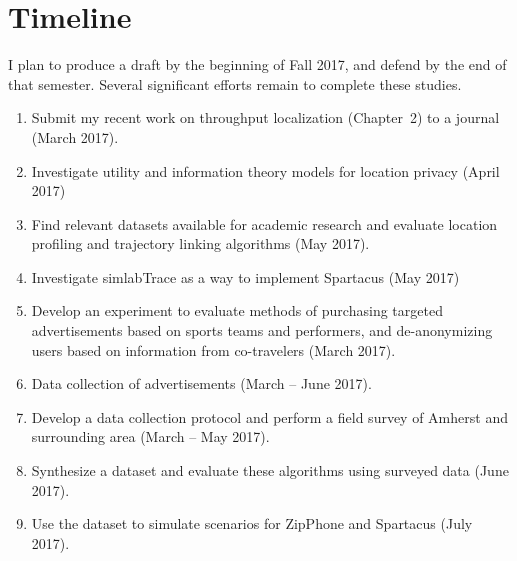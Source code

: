 \chapter{Timeline}
I plan to produce a draft by the beginning of Fall 2017, and defend by the end of that semester. Several significant efforts remain to complete these studies.
\begin{enumerate}
	\item Submit my recent work on throughput localization (Chapter~2) to a journal (March 2017).
	\item Investigate utility and information theory models for location privacy (April 2017)
	\item Find relevant datasets available for academic research and evaluate location profiling and trajectory linking algorithms (May 2017).
	\item Investigate simlabTrace as a way to implement Spartacus (May 2017)
	\item Develop an experiment to evaluate methods of purchasing targeted advertisements based on sports teams and performers, and de-anonymizing users based on information from co-travelers (March 2017).
	\item Data collection of advertisements (March -- June 2017).
	\item Develop a data collection protocol and perform a field survey of Amherst and surrounding area (March -- May 2017).
	\item Synthesize a dataset and evaluate these algorithms using surveyed data (June 2017).
	\item Use the dataset to simulate scenarios for ZipPhone and Spartacus (July 2017).
\end{enumerate}